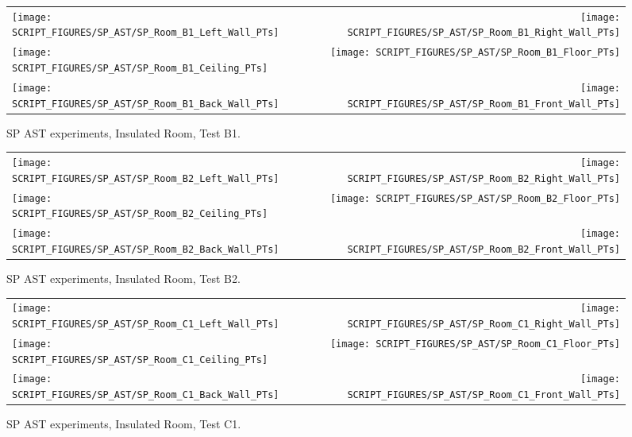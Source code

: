 \begin{figure}[p]
\begin{tabular*}{\textwidth}{l@{\extracolsep{\fill}}r}
\texttt{[image: SCRIPT\_FIGURES/SP\_AST/SP\_Room\_B1\_Left\_Wall\_PTs]} &  \texttt{[image: SCRIPT\_FIGURES/SP\_AST/SP\_Room\_B1\_Right\_Wall\_PTs]}  \\
\texttt{[image: SCRIPT\_FIGURES/SP\_AST/SP\_Room\_B1\_Ceiling\_PTs]}   &  \texttt{[image: SCRIPT\_FIGURES/SP\_AST/SP\_Room\_B1\_Floor\_PTs]}  \\
\texttt{[image: SCRIPT\_FIGURES/SP\_AST/SP\_Room\_B1\_Back\_Wall\_PTs]} &  \texttt{[image: SCRIPT\_FIGURES/SP\_AST/SP\_Room\_B1\_Front\_Wall\_PTs]}
\end{tabular*}
\caption[SP AST experiments, Insulated Room, Test B1]{SP AST experiments, Insulated Room, Test B1.}
\label{SP_Room_B1_PTs}
\end{figure}

\begin{figure}[p]
\begin{tabular*}{\textwidth}{l@{\extracolsep{\fill}}r}
\texttt{[image: SCRIPT\_FIGURES/SP\_AST/SP\_Room\_B2\_Left\_Wall\_PTs]} &  \texttt{[image: SCRIPT\_FIGURES/SP\_AST/SP\_Room\_B2\_Right\_Wall\_PTs]}  \\
\texttt{[image: SCRIPT\_FIGURES/SP\_AST/SP\_Room\_B2\_Ceiling\_PTs]}   &  \texttt{[image: SCRIPT\_FIGURES/SP\_AST/SP\_Room\_B2\_Floor\_PTs]}  \\
\texttt{[image: SCRIPT\_FIGURES/SP\_AST/SP\_Room\_B2\_Back\_Wall\_PTs]} &  \texttt{[image: SCRIPT\_FIGURES/SP\_AST/SP\_Room\_B2\_Front\_Wall\_PTs]}
\end{tabular*}
\caption[SP AST experiments, Insulated Room, Test B2]{SP AST experiments, Insulated Room, Test B2.}
\label{SP_Room_B2_PTs}
\end{figure}

\begin{figure}[p]
\begin{tabular*}{\textwidth}{l@{\extracolsep{\fill}}r}
\texttt{[image: SCRIPT\_FIGURES/SP\_AST/SP\_Room\_C1\_Left\_Wall\_PTs]} &  \texttt{[image: SCRIPT\_FIGURES/SP\_AST/SP\_Room\_C1\_Right\_Wall\_PTs]}  \\
\texttt{[image: SCRIPT\_FIGURES/SP\_AST/SP\_Room\_C1\_Ceiling\_PTs]}   &  \texttt{[image: SCRIPT\_FIGURES/SP\_AST/SP\_Room\_C1\_Floor\_PTs]}  \\
\texttt{[image: SCRIPT\_FIGURES/SP\_AST/SP\_Room\_C1\_Back\_Wall\_PTs]} &  \texttt{[image: SCRIPT\_FIGURES/SP\_AST/SP\_Room\_C1\_Front\_Wall\_PTs]}
\end{tabular*}
\caption[SP AST experiments, Insulated Room, Test C1]{SP AST experiments, Insulated Room, Test C1.}
\label{SP_Room_C1_PTs}
\end{figure}

